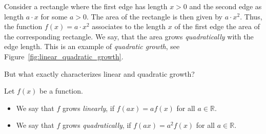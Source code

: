 \begin{example} \label{ex:quadratic_growth}
	Consider a rectangle where the first edge has length $x>0$ and the second edge as length $a\cdot x$ for some $a>0$.
	The area of the rectangle is then given by $a\cdot x^2$.
	Thus, the function $f\left(x\right)=a\cdot x^2$ associates to the length $x$ of the first edge the area of the corresponding rectangle.
	We say, that the area grows \textit{quadratically} with the edge length.
	This is an example of \textit{quadratic growth}, see Figure~\ref{fig:linear_quadratic_growth}.
\end{example}
But what exactly characterizes linear and quadratic growth?
\begin{tcolorbox}
	Let $f\left(x\right)$ be a function.
	\begin{itemize}
		\item We say that $f$ grows \textit{linearly}, if $f\left(ax\right)=af\left(x\right)$ for all $a\in\mathbb R$.
		\item We say that $f$ grows \textit{quadratically}, if $f\left(ax\right)=a^2f\left(x\right)$ for all $a\in\mathbb R$.
	\end{itemize}
\end{tcolorbox}
